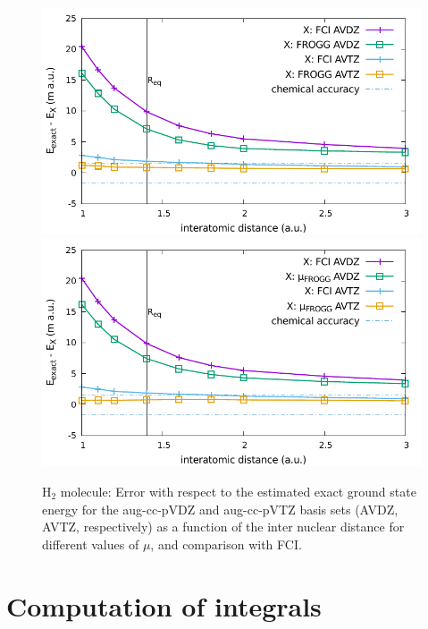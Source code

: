 \documentclass[aip,jcp,reprint,noshowkeys,superscriptaddress]{revtex4-1}
\begin{document}
\begin{figure}
        \includegraphics[width=0.45\linewidth]{plots/H2/H2_de_fci_frogg.pdf}
        \includegraphics[width=0.45\linewidth]{plots/H2/H2_de_fci_mu_ten_no.pdf}\\
        \caption{
        H$_2$ molecule: Error with respect to the estimated exact ground state energy for the aug-cc-pVDZ and aug-cc-pVTZ basis sets (AVDZ, AVTZ, respectively) as a function of the inter nuclear distance for different values of $\mu$, and comparison with FCI.  
}
\end{figure}

\section{Computation of integrals}
\end{document}
